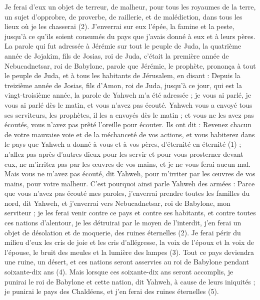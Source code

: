 \begin{multicols}{2}
Je ferai d’eux un objet de terreur, de malheur, pour tous les royaumes de la terre, un sujet d’opprobre, de proverbe, de raillerie, et de malédiction, dans tous les lieux où je les chasserai\FTNT{} (2).
J'enverrai sur eux l'épée, la famine et la peste, jusqu’à ce qu'ils soient consumés du pays que j’avais donné à eux et à leurs pères.
\VerseOne{}La parole qui fut adressée à Jérémie sur tout le peuple de Juda, la quatrième année de Jojakim, fils de Josias, roi de Juda, c’était la première année de Nebucadnetsar, roi de Babylone,
parole que Jérémie, le prophète, prononça à tout le peuple de Juda, et à tous les habitants de Jérusalem, en disant :
Depuis la treizième année de Josias, fils d'Amon, roi de Juda, jusqu’à ce jour, qui est la vingt-troisième année, la parole de Yahweh m'a été adressée ; je vous ai parlé, je vous ai parlé dès le matin, et vous n'avez pas écouté.
Yahweh vous a envoyé tous ses serviteurs, les prophètes, il les a envoyés dès le matin ; et vous ne les avez pas écoutés, vous n'avez pas prêté l’oreille pour écouter.
Ils ont dit : Revenez chacun de votre mauvaise voie et de la méchanceté de vos actions, et vous habiterez dans le pays que Yahweh a donné à vous et à vos pères, d’éternité en éternité\FTNT{} (1) ;
n'allez pas après d'autres dieux pour les servir et pour vous prosterner devant eux, ne m'irritez pas par les œuvres de vos mains, et je ne vous ferai aucun mal.
Mais vous ne m'avez pas écouté, dit Yahweh, pour m'irriter par les œuvres de vos mains, pour votre malheur.
C'est pourquoi ainsi parle Yahweh des armées : Parce que vous n'avez pas écouté mes paroles,
j'enverrai prendre toutes les familles du nord, dit Yahweh, et j'enverrai vers Nebucadnetsar, roi de Babylone, mon serviteur ; je les ferai venir contre ce pays et contre ses habitants, et contre toutes ces nations d'alentour, je les détruirai par le moyen de l'interdit, j’en ferai un objet de désolation et de moquerie, des ruines éternelles\FTNT{} (2).
Je ferai périr du milieu d’eux les cris de joie et les cris d'allégresse, la voix de l'époux et la voix de l'épouse, le bruit des meules et la lumière des lampes\FTNT{} (3).
Tout ce pays deviendra une ruine, un désert, et ces nations seront asservies au roi de Babylone pendant soixante-dix ans\FTNT{} (4).
Mais lorsque ces soixante-dix ans seront accomplis, je punirai le roi de Babylone et cette nation, dit Yahweh, à cause de leurs iniquités ; je punirai le pays des Chaldéens, et j’en ferai des ruines éternelles\FTNT{} (5).

\end{multicols}
